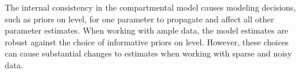 The internal consistency in the compartmental model causes modeling
decisions, such as priors on level, for one parameter to propagate and
affect all other parameter estimates.  When working with ample data,
the model estimates are robust against the choice of informative priors on
level.  However, these choices can cause substantial changes to
estimates when working with sparse and noisy data.




